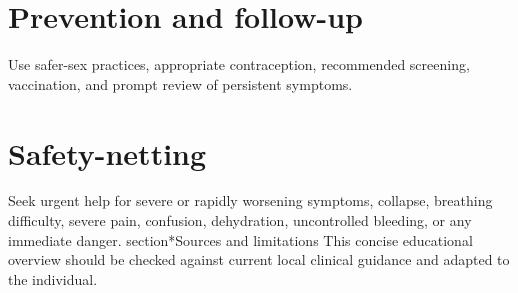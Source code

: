 \section*{Prevention and follow-up}
Use safer-sex practices, appropriate contraception, recommended screening, vaccination, and prompt review of persistent symptoms.
\section*{Safety-netting}
Seek urgent help for severe or rapidly worsening symptoms, collapse, breathing difficulty, severe pain, confusion, dehydration, uncontrolled bleeding, or any immediate danger.
section*{Sources and limitations}
This concise educational overview should be checked against current local clinical guidance and adapted to the individual.
